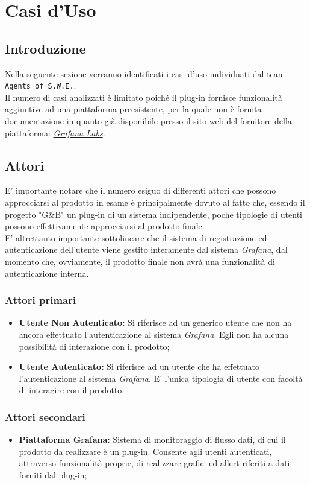 \section{Casi d'Uso}\label{CasiUso}
\subsection{Introduzione}\label{CasiUso_Introduzione}
Nella seguente sezione verranno identificati i casi d'uso individuati dal team \texttt{Agents of S.W.E.}.\\
Il numero di casi analizzati è limitato poiché il plug-in fornisce funzionalità aggiuntive ad una piattaforma preesistente, per la quale non è fornita documentazione in quanto già disponibile presso il sito web del fornitore della piattaforma: \href{http://docs.grafana.org/}{\textit{Grafana Labs}}.

\subsection{Attori}\label{Attori}
E' importante notare che il numero esiguo di differenti attori che possono approcciarsi al prodotto in esame è principalmente dovuto al fatto che, essendo il progetto "G\&B" un plug-in di un sistema indipendente, poche tipologie di utenti possono effettivamente approcciarsi al prodotto finale.\\
E' altrettanto importante sottolineare che il sistema di registrazione ed autenticazione dell'utente viene gestito interamente dal sistema \textit{Grafana}, dal momento che, ovviamente, il prodotto finale non avrà una funzionalità di autenticazione interna.

\subsubsection*{Attori primari}
\begin{itemize}
\item \textbf{Utente Non Autenticato:} Si riferisce ad un generico utente che non ha ancora effettuato l'autenticazione al sistema \textit{Grafana}\glossario. Egli non ha alcuna possibilità di interazione con il prodotto;
\item \textbf{Utente Autenticato:} Si riferisce ad un utente che ha effettuato l'autenticazione al sistema \textit{Grafana}. E' l'unica tipologia di utente con facoltà di interagire con il prodotto.
\end{itemize}

\subsubsection*{Attori secondari}
\begin{itemize}
\item \textbf{Piattaforma Grafana:} Sistema di monitoraggio di flusso dati, di cui il prodotto da realizzare è un plug-in. Consente agli utenti autenticati, attraverso funzionalità proprie, di realizzare grafici ed allert riferiti a dati forniti dal plug-in;
\end{itemize}

